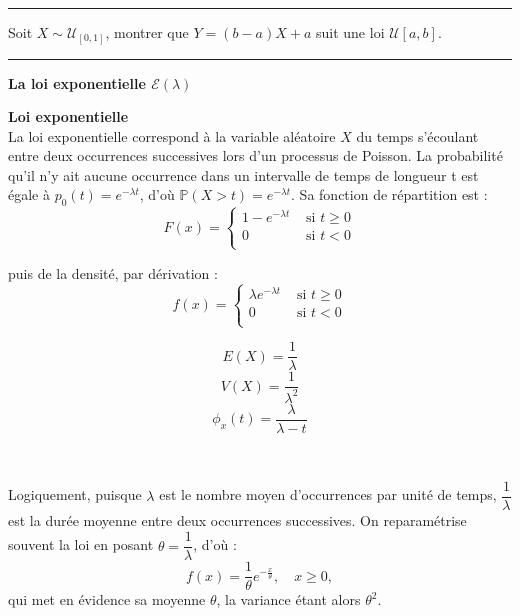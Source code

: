 \documentclass[../PolyS4.tex]{subfiles}
\begin{document}
\vspace{1em}
\hrule
\vspace{1em}


Soit $X \sim \mathcal{U}_{[0, 1]}$, montrer que $Y = (b - a)X + a$ suit une loi $\mathcal{U}[a, b]$.

\vspace{1em}
\hrule
\vspace{1em}

\textbf{La loi exponentielle $\mathcal{E}(\lambda)$}

\begin{Def}\textbf{Loi exponentielle}\\
La loi exponentielle correspond à la variable aléatoire $X$ du temps s'écoulant entre deux occurrences successives lors d'un processus de Poisson. La probabilité qu'il n'y ait aucune occurrence dans un intervalle de temps de longueur t est égale à $p_0(t) = e^{-\lambda t}$, d'où $\mathbb{P}(X > t) = e^{ -\lambda t}$.
Sa fonction de répartition est :
$$F(x) =
\left\{
\begin{array}{ll}
1-e^{-\lambda t}& \text{ si } t \geq  0\\
0& \text{ si } t<0\\
\end{array}
\right.$$

puis de la densité, par dérivation :
$$f(x) =
\left\{
\begin{array}{ll}
\lambda e^{-\lambda t}& \text{ si } t \geq 0\\
0& \text{ si } t<0\\
\end{array}
\right.$$
\end{Def}


\begin{Prop}
$$E(X) =\dfrac{1}{\lambda}$$
$$V (X) =\dfrac{1}{\lambda^2}$$
$$\phi_x(t)=\dfrac{\lambda}{\lambda-t}$$
\end{Prop}

\begin{Rmq}$\,$

Logiquement, puisque $\lambda$ est le nombre moyen d'occurrences par unité de temps, $\dfrac{1}{\lambda}$ est la durée moyenne entre deux occurrences successives. On reparamétrise souvent la loi en posant $\theta = \dfrac{1}{\lambda}$, d'où :
$$f(x) = \dfrac{1}{\theta}e^{-\frac{x}{\theta}}, \quad x \geq 0,$$
qui met en évidence sa moyenne $\theta$, la variance étant alors $\theta^2$.
\end{Rmq}
\end{document}

